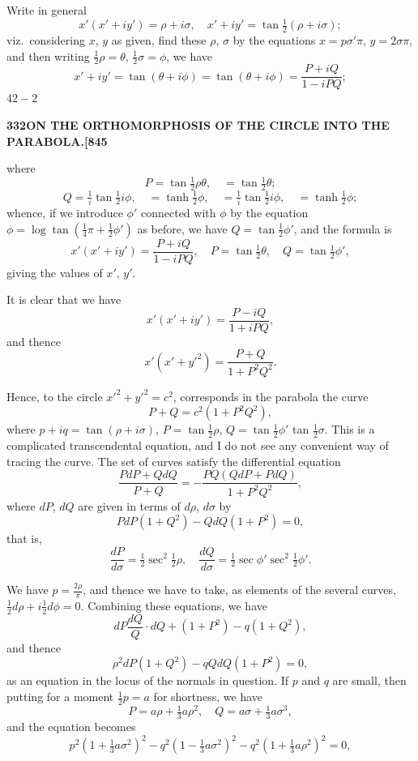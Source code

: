 \documentclass[12pt,a4paper]{article}
\theoremstyle{definition}
\begin{document}
Write in general
\[
x'(x' + iy') = \rho + i\sigma, \quad x' + iy' = \tan\tfrac{1}{2}(\rho + i\sigma);
\]
viz.\ considering $x$, $y$ as given, find these $\rho$, $\sigma$ by the equations $x = p\sigma'\pi$, $y = 2\sigma\pi$, and then writing $\tfrac{1}{2}\rho = \theta$, $\tfrac{1}{2}\sigma = \phi$, we have
\[
x' + iy' = \tan(\theta + i\phi) = \tan(\theta + i\phi) = \frac{P + iQ}{1 - iPQ};
\]
\hfill $42 - 2$

\newpage
\setcounter{page}{332}

\noindent\textbf{332}\hfill\textbf{ON THE ORTHOMORPHOSIS OF THE CIRCLE INTO THE PARABOLA.}\hfill\textbf{[845}

\bigskip

\noindent where
\[
P = \tan\tfrac{1}{2}\rho\theta, \quad = \tan\tfrac{1}{2}\theta;
\]
\[
Q = \tfrac{1}{i}\tan\tfrac{1}{2}i\phi, \quad = \tanh\tfrac{1}{2}\phi, \quad = \tfrac{1}{i}\tan\tfrac{1}{2}i\phi, \quad = \tanh\tfrac{1}{2}\phi;
\]
whence, if we introduce $\phi'$ connected with $\phi$ by the equation $\phi = \log\tan(\tfrac{1}{4}\pi + \tfrac{1}{2}\phi')$ as before, we have $Q = \tan\tfrac{1}{2}\phi'$, and the formula is
\[
x'(x' + iy') = \frac{P + iQ}{1 - iPQ}, \quad P = \tan\tfrac{1}{2}\theta, \quad Q = \tan\tfrac{1}{2}\phi',
\]
giving the values of $x'$, $y'$.

It is clear that we have
\[
x'(x' + iy') = \frac{P - iQ}{1 + iPQ},
\]
and thence
\[
x'(x' + y'^2) = \frac{P + Q}{1 + P^2Q^2}.
\]

Hence, to the circle $x'^2 + y'^2 = c^2$, corresponds in the parabola the curve
\[
P + Q = c^2(1 + P^2Q^2),
\]
where $p + iq = \tan(\rho + i\sigma)$, $P = \tan\tfrac{1}{2}\rho$, $Q = \tan\tfrac{1}{2}\phi'$ tan $\tfrac{1}{2}\sigma$. This is a complicated transcendental equation, and I do not see any convenient way of tracing the curve. The set of curves satisfy the differential equation
\[
\frac{P dP + Q dQ}{P + Q} = -\frac{P Q (Q dP + P dQ)}{1 + P^2 Q^2},
\]
where $dP$, $dQ$ are given in terms of $d\rho$, $d\sigma$ by
\[
P dP(1 + Q^2) - Q dQ(1 + P^2) = 0,
\]
that is,
\[
\frac{dP}{d\sigma} = \tfrac{1}{2}\sec^2\tfrac{1}{2}\rho, \quad \frac{dQ}{d\sigma} = \tfrac{1}{2}\sec\phi'\sec^2\tfrac{1}{2}\phi'.
\]

We have $p = \tfrac{2\rho}{\pi}$, and thence we have to take, as elements of the several curves, $\tfrac{1}{2}d\rho + i \tfrac{1}{2}d\phi = 0$. Combining these equations, we have
\[
dP \frac{dQ}{Q} \cdot dQ + (1 + P^2) - q(1 + Q^2),
\]
and thence
\[
\rho^2 dP(1 + Q^2) - qQ dQ(1 + P^2) = 0,
\]
as an equation in the locus of the normals in question. If $p$ and $q$ are small, then putting for a moment $\tfrac{1}{2}p = a$ for shortness, we have
\[
P = a\rho + \tfrac{1}{3}a\rho^2, \quad Q = a\sigma + \tfrac{1}{3}a\sigma^3,
\]
and the equation becomes
\[
p^2(1 + \tfrac{1}{3}a\sigma^2)^2 - q^2(1 - \tfrac{1}{3}a\sigma^2)^2 - q^2(1 + \tfrac{1}{3}a\rho^2)^2 = 0,
\]
\end{document}
